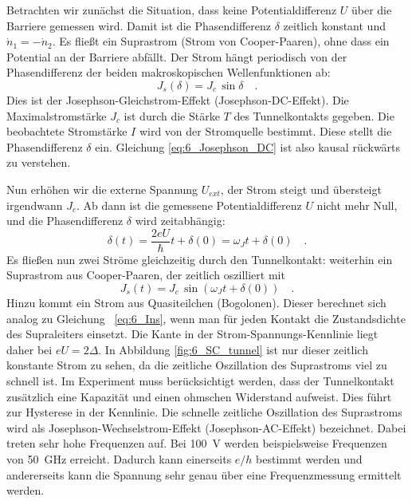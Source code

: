Betrachten wir zunächst die Situation, dass keine  Potentialdifferenz $U$ über die Barriere gemessen wird. Damit ist die Phasendifferenz $\delta$ zeitlich konstant und $ \dot{n}_1 = - \dot{n}_2$. Es fließt ein Suprastrom (Strom von Cooper-Paaren), ohne dass ein Potential an der Barriere abfällt. Der Strom hängt periodisch von der Phasendifferenz der beiden makroskopischen Wellenfunktionen ab:
\begin{equation}
    J_s(\delta) = J_c \, \sin \delta \quad . \label{eq:6_Josephson_DC}
\end{equation}
 Dies ist der Josephson-Gleichstrom-Effekt (Josephson-DC-Effekt). Die Maximalstromstärke $J_c$ ist durch die  Stärke $T$ des Tunnelkontakts gegeben. Die beobachtete Stromstärke $I$ wird von der  Stromquelle bestimmt. Diese stellt die Phasendifferenz $\delta$ ein. Gleichung \ref{eq:6_Josephson_DC} ist also kausal rückwärts zu verstehen.



Nun erhöhen wir die externe Spannung $U_{ext}$, der Strom steigt und übersteigt irgendwann $J_c$. Ab dann ist die gemessene Potentialdifferenz $U$ nicht mehr Null, und die Phasendifferenz $\delta$ wird zeitabhängig:
\begin{equation}
    \delta(t) = \frac{2eU}{\hbar} t + \delta(0)  = \omega_J t +  \delta(0)  \quad .
\end{equation}
Es fließen nun zwei Ströme gleichzeitig durch den Tunnelkontakt: weiterhin ein Suprastrom aus Cooper-Paaren, der zeitlich oszilliert mit 
\begin{equation}
    J_s(t) = J_c \, \sin  ( \omega_J t +  \delta(0) ) \quad .
\end{equation}
Hinzu kommt ein Strom aus Quasiteilchen (Bogolonen). Dieser berechnet sich analog zu Gleichung ~\ref{eq:6_Ins}, wenn man für jeden Kontakt die Zustandsdichte des Supraleiters einsetzt. Die Kante in der Strom-Spannungs-Kennlinie liegt daher bei $e U = 2 \Delta$. In Abbildung  \ref{fig:6_SC_tunnel} ist nur dieser zeitlich konstante Strom zu sehen, da die zeitliche Oszillation des Suprastroms viel zu schnell ist. Im Experiment muss berücksichtigt werden, dass der Tunnelkontakt zusätzlich eine Kapazität und einen ohmschen Widerstand aufweist. Dies führt zur  Hysterese in der Kennlinie.
Die schnelle zeitliche Oszillation des Suprastroms wird  als Josephson-Wechselstrom-Effekt (Josephson-AC-Effekt) bezeichnet. Dabei treten sehr hohe Frequenzen auf. Bei 100~\textmu V werden beispielsweise Frequenzen von 50~GHz erreicht. Dadurch kann einerseits $e/h$ bestimmt werden und andererseits kann die Spannung sehr genau über eine Frequenzmessung ermittelt werden.

